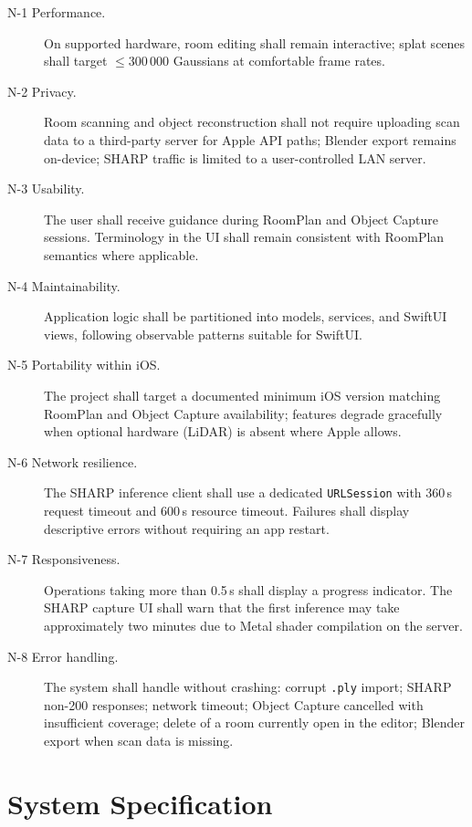 \begin{description}
    \item[N-1 Performance.] On supported hardware, room editing shall remain interactive; splat scenes shall target $\leq 300\,000$ Gaussians at comfortable frame rates.

    \item[N-2 Privacy.] Room scanning and object reconstruction shall not require uploading scan data to a third-party server for Apple API paths; Blender export remains on-device; SHARP traffic is limited to a user-controlled LAN server.

    \item[N-3 Usability.] The user shall receive guidance during RoomPlan and Object Capture sessions. Terminology in the UI shall remain consistent with RoomPlan semantics where applicable.

    \item[N-4 Maintainability.] Application logic shall be partitioned into models, services, and SwiftUI views, following observable patterns suitable for SwiftUI.

    \item[N-5 Portability within iOS.] The project shall target a documented minimum iOS version matching RoomPlan and Object Capture availability; features degrade gracefully when optional hardware (LiDAR) is absent where Apple allows.

    \item[N-6 Network resilience.] The SHARP inference client shall use a dedicated \texttt{URLSession} with 360\,s request timeout and 600\,s resource timeout. Failures shall display descriptive errors without requiring an app restart.

    \item[N-7 Responsiveness.] Operations taking more than 0.5\,s shall display a progress indicator. The SHARP capture UI shall warn that the first inference may take approximately two minutes due to Metal shader compilation on the server.

    \item[N-8 Error handling.] The system shall handle without crashing: corrupt \texttt{.ply} import; SHARP non-200 responses; network timeout; Object Capture cancelled with insufficient coverage; delete of a room currently open in the editor; Blender export when scan data is missing.
\end{description}

\section{System Specification}
\label{sec:system_spec}

